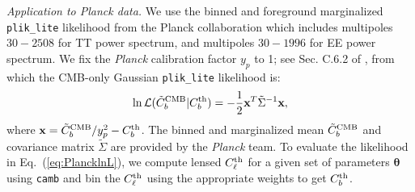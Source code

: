 \documentclass[amsmath, prl, reprint, aps]{revtex4-1}
\newcommand{\xv}{\textbf{x}}
\newcommand{\tv}{\bm{\theta}}
\begin{document}
    \medskip
    \textit{Application to Planck data.} 
    We use the binned and foreground marginalized \texttt{plik\_lite} likelihood from the Planck collaboration \cite{Aghanim:2015xee} which includes multipoles $30-2508$ for TT power spectrum, and multipoles $30-1996$ for EE power spectrum. We fix the {\it Planck} calibration factor $y_p$ to 1; see Sec. C.6.2 of \cite{Aghanim:2015xee}, from which the CMB-only Gaussian \texttt{plik\_lite} likelihood is:
    \begin{align}
        \ln \mathcal{L}(\tilde{C}_b^{\rm CMB}|C_b^{\rm th}) = -\frac{1}{2}\xv^T \tilde{\Sigma}^{-1} \xv, \label{eq:PlancklnL}
    \end{align}
    where $\xv = \tilde{C}_b^{\rm CMB}/y_p^2 - C_b^{\rm th}$. The binned and marginalized mean $\tilde{C}_b^{\rm CMB}$ and covariance matrix $\tilde{\Sigma}$ are provided by the {\it Planck} team. To evaluate the likelihood in Eq.~(\ref{eq:PlancklnL}), we compute lensed $C_\ell^{\rm th}$ for a given set of parameters $\tv$ using \texttt{camb} \cite{Lewis:1999bs,Howlett:2012mh} and bin the $C_\ell^{\rm th}$ using the appropriate weights to get $C_b^{\rm th}$.
    
\end{document}
